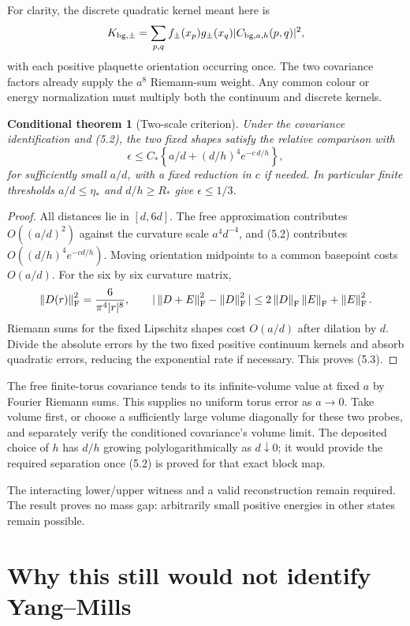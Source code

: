 \documentclass[11pt]{article}
\newtheorem{theorem}[proposition]{Conditional theorem}
\theoremstyle{remark}
\newcommand{\norm}[1]{\left\|#1\right\|}
\begin{document}
For clarity, the discrete quadratic kernel meant here is
\[
 K_{{\rm bg},\pm}=\sum_{p,q}f_\pm(x_p)g_\pm(x_q)
                       |C_{{\rm bg},a,h}(p,q)|^2,
\]
with each positive plaquette orientation occurring once. The two
covariance factors already supply the $a^8$ Riemann-sum weight.
Any common colour or energy normalization must multiply both the
continuum and discrete kernels.

\begin{theorem}[Two-scale criterion]
Under the covariance identification and (5.2), the two fixed shapes
satisfy the relative comparison with
\[
 \epsilon\leq C_*\left\{a/d+(d/h)^4e^{-c\,d/h}\right\},
 \tag{5.3}
\]
for sufficiently small $a/d$, with a fixed reduction in $c$ if needed.
In particular finite thresholds $a/d\leq\eta_*$ and $d/h\geq R_*$
give $\epsilon\leq1/3$.
\end{theorem}
\begin{proof}
All distances lie in $[d,6d]$. The free approximation contributes
$O((a/d)^2)$ against the curvature scale $a^4d^{-4}$, and (5.2)
contributes $O((d/h)^4e^{-cd/h})$. Moving orientation midpoints to a
common basepoint costs $O(a/d)$. For the six by six curvature matrix,
\[
 \norm{D(r)}_{\rm F}^2=\frac6{\pi^4|r|^8},\qquad
 |\norm{D+E}_{\rm F}^2-\norm D_{\rm F}^2|
 \leq2\norm D_{\rm F}\norm E_{\rm F}+\norm E_{\rm F}^2.
\]
Riemann sums for the fixed Lipschitz shapes cost $O(a/d)$ after dilation
by $d$. Divide the absolute errors by the two fixed positive continuum
kernels and absorb quadratic errors, reducing the exponential rate if
necessary. This proves (5.3).
\end{proof}

The free finite-torus covariance tends to its infinite-volume value at
fixed $a$ by Fourier Riemann sums. This supplies no uniform torus error
as $a\to0$. Take volume first, or choose a sufficiently large volume
diagonally for these two probes, and separately verify the conditioned
covariance's volume limit. The deposited choice of $h$ has $d/h$
growing polylogarithmically as $d\downarrow0$; it would provide the
required separation once (5.2) is proved for that exact block map.

The interacting lower/upper witness and a valid reconstruction remain
required. The result proves no mass gap: arbitrarily small positive
energies in other states remain possible.

\section{Why this still would not identify Yang--Mills}
\end{document}
